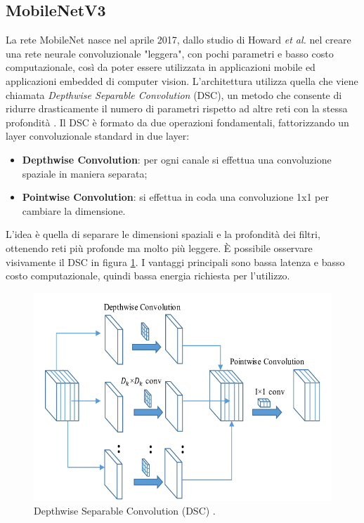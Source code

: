 \documentclass[11pt]{report}
\begin{document}
\subsection{MobileNetV3}

La rete MobileNet nasce nel aprile 2017, dallo studio di Howard \textit{et al.} \cite{mobilenet2017} nel creare una rete neurale convoluzionale "leggera", con pochi parametri e basso costo computazionale, così da poter essere utilizzata in applicazioni mobile ed applicazioni embedded di computer vision.  L'architettura utilizza quella che viene chiamata \textit{Depthwise Separable Convolution} (DSC), un metodo che consente di ridurre drasticamente il numero di parametri rispetto ad altre reti con la stessa profondità  \cite{pujara_2020}. Il DSC è formato da due operazioni fondamentali, fattorizzando un layer convoluzionale standard in due layer:
\begin{itemize}
    \item \textbf{Depthwise Convolution}: per ogni canale si effettua una convoluzione spaziale in maniera separata;
    \item \textbf{Pointwise Convolution}: si effettua in coda una convoluzione 1x1 per cambiare la dimensione.
\end{itemize}

L'idea è quella di separare le dimensioni spaziali e la profondità dei filtri, ottenendo reti più profonde ma molto più leggere. È possibile osservare visivamente il DSC in figura \ref{fig:DSC}. I vantaggi principali sono bassa latenza e basso costo computazionale, quindi bassa energia richiesta per l'utilizzo.


\begin{figure}
    \centering
    \includegraphics[scale=0.45]{img/Depthwise-separable-convolution-block.png}
    \caption{Depthwise Separable Convolution (DSC) \cite{dsc}.}
    \label{fig:DSC}
\end{figure}
\end{document}
